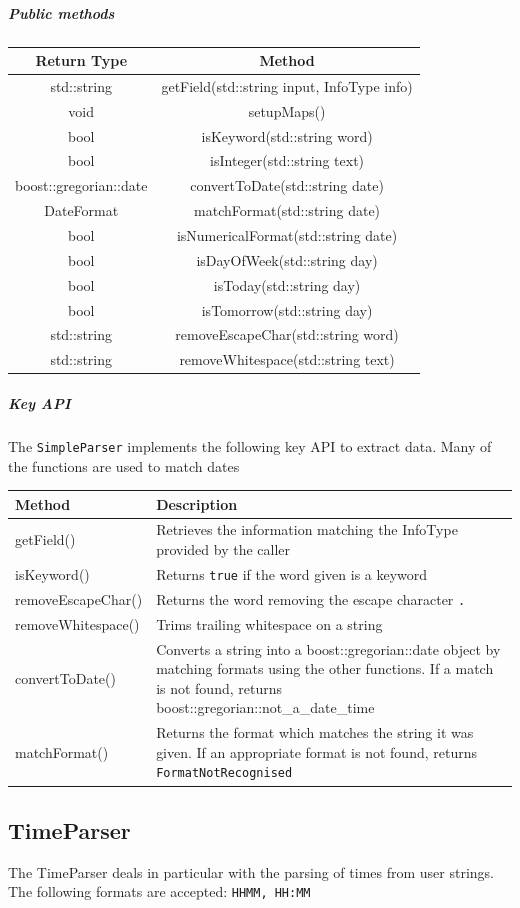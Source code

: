 \documentclass[12pt]{extarticle}
\begin{document}
\subparagraph{Public methods}
\begin{tabular}{c c}
Return Type & Method\\
\hline
std::string & getField(std::string input, InfoType info)\\
void & setupMaps()\\
bool & isKeyword(std::string word)\\
bool & isInteger(std::string text)\\
boost::gregorian::date & convertToDate(std::string date)\\
DateFormat & matchFormat(std::string date)\\
bool & isNumericalFormat(std::string date)\\
bool & isDayOfWeek(std::string day)\\
bool & isToday(std::string day)\\
bool & isTomorrow(std::string day)\\
std::string & removeEscapeChar(std::string word)\\
std::string & removeWhitespace(std::string text)\\
\end{tabular}

\subparagraph{Key API}The \texttt{SimpleParser} implements the following key API to extract data. Many of the functions are used to match dates\\
\begin{tabular}{p{6cm} p{12cm}}
Method & Description\\
\hline
getField() & Retrieves the information matching the InfoType provided by the caller\\
isKeyword() & Returns \texttt{true} if the word given is a keyword\\
removeEscapeChar() & Returns the word removing the escape character \texttt{.}\\
removeWhitespace() & Trims trailing whitespace on a string\\
convertToDate() & Converts a string into a boost::gregorian::date object by matching formats using the other functions. If a match is not found, returns boost::gregorian::not\_a\_date\_time\\
matchFormat() & Returns the format which matches the string it was given. If an appropriate format is not found, returns \texttt{FormatNotRecognised}\\
\end{tabular}

\subsection{TimeParser}
The TimeParser deals in particular with the parsing of times from user strings. The following formats are accepted: \texttt{HHMM, HH:MM}
\end{document}
